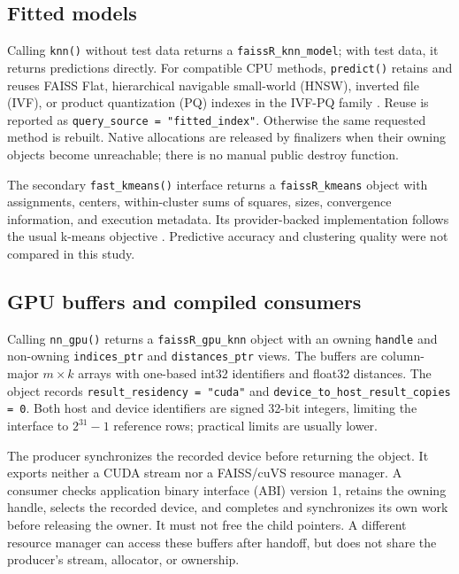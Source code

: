 \documentclass[11pt]{article}
\newcommand{\code}[1]{\texttt{#1}}
\newcommand{\class}[1]{\texttt{#1}}
\begin{document}
\subsection{Fitted models}

Calling \code{knn()} without test data returns a
\class{faissR\_knn\_model}; with test data, it returns predictions directly.
For compatible CPU methods, \code{predict()} retains and reuses FAISS Flat,
hierarchical navigable small-world (HNSW), inverted file (IVF), or
product quantization (PQ) indexes in the IVF-PQ family
\citep{MalkovYashunin2020,JegouDouzeSchmid2011}. Reuse is reported as
\code{query\_source = "fitted\_index"}. Otherwise the same requested method
is rebuilt. Native allocations are released by finalizers when their
owning objects become unreachable; there is no manual public destroy function.

The secondary \code{fast\_kmeans()} interface returns a
\class{faissR\_kmeans} object with assignments, centers, within-cluster sums
of squares, sizes, convergence information, and execution metadata.
Its provider-backed implementation follows the usual k-means objective
\citep{MacQueen1967,Lloyd1982}. Predictive accuracy and clustering quality
were not compared in this study.

\subsection{GPU buffers and compiled consumers}

Calling \code{nn\_gpu()} returns a \class{faissR\_gpu\_knn} object with an
owning \code{handle} and non-owning \code{indices\_ptr} and
\code{distances\_ptr} views. The buffers are column-major $m\times k$ arrays
with one-based int32 identifiers and float32 distances. The object records
\code{result\_residency = "cuda"} and
\code{device\_to\_host\_result\_copies = 0}.
Both host and device identifiers are signed 32-bit integers, limiting the
interface to $2^{31}-1$ reference rows; practical limits are usually lower.

The producer synchronizes the recorded device before returning the object.
It exports neither a CUDA stream nor a FAISS/cuVS resource manager.
A consumer checks application binary interface (ABI) version 1, retains the
owning handle, selects the recorded device, and completes and synchronizes
its own work before releasing the owner. It must not free the child pointers.
A different resource manager can access these buffers after handoff, but
does not share the producer's stream, allocator, or ownership.
\end{document}
